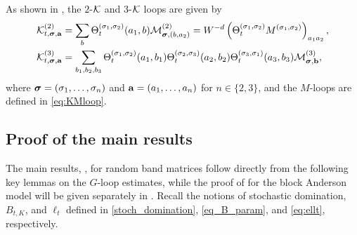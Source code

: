 \begin{example} 
As shown in \cite{YY_25,RBSO1D}, the $2$-$\mathcal K$ and $3$-$\mathcal K$ loops are given by %
\begin{align}\label{Kn2sol}\mathcal K^{(2)}_{t,{\boldsymbol{\sigma}},{\mathbf{a}}}&= \sum_{b}\Theta_{t}^{(\sigma_1,\sigma_2)}(a_1,b)\mathcal M^{(2)}_{{\boldsymbol{\sigma}},(b,a_2)}=W^{-d} \left(\Theta_t^{(\sigma_1,\sigma_2)}  M^{(\sigma_1,\sigma_2)}\right)_{a_1a_2},\\
\label{Kn3sol} \mathcal{K}^{(3)}_{t, {\boldsymbol{\sigma}}, {\mathbf{a}}} &= \sum_{b_1,b_2,b_3}\Theta_{t}^{(\sigma_1,\sigma_2)}(a_1,b_1)\Theta_{t}^{(\sigma_2,\sigma_3)}(a_2,b_2)\Theta_{t}^{(\sigma_3,\sigma_1)}(a_3,b_3) \mathcal M^{(3)}_{{\boldsymbol{\sigma}},\mathbf b},
\end{align}
where ${\boldsymbol{\sigma}}=(\sigma_1,\ldots,\sigma_n)$ and ${\mathbf{a}}=(a_1,\ldots,a_n)$ for $n\in \{2,3\}$, and the $M$-loops are defined in \eqref{eq:KMloop}. 

\end{example}

 
\subsection{Proof of the main results}
 
The main results, , for random band matrices follow directly from the following key lemmas on the $G$-loop estimates, while the proof of  for the block Anderson model will be given separately in . Recall the notions of stochastic domination, $B_{t, K}$, and $\ell_t$ defined in \eqref{stoch_domination}, \eqref{eq_B_param}, and \eqref{eq:ellt}, respectively. 



